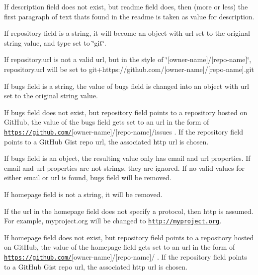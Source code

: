 \begin{DoxyItemize}
\item If {\ttfamily description} field does not exist, but {\ttfamily readme} field does, then (more or less) the first paragraph of text that\textquotesingle{}s found in the readme is taken as value for {\ttfamily description}.
\item If {\ttfamily repository} field is a string, it will become an object with {\ttfamily url} set to the original string value, and {\ttfamily type} set to {\ttfamily \char`\"{}git\char`\"{}}.
\item If {\ttfamily repository.\+url} is not a valid url, but in the style of \char`\"{}\mbox{[}owner-\/name\mbox{]}/\mbox{[}repo-\/name\mbox{]}\char`\"{}, {\ttfamily repository.\+url} will be set to git+https\+://github.com/\mbox{[}owner-\/name\mbox{]}/\mbox{[}repo-\/name\mbox{]}.git
\item If {\ttfamily bugs} field is a string, the value of {\ttfamily bugs} field is changed into an object with {\ttfamily url} set to the original string value.
\item If {\ttfamily bugs} field does not exist, but {\ttfamily repository} field points to a repository hosted on Git\+Hub, the value of the {\ttfamily bugs} field gets set to an url in the form of \href{https://github.com/}{\tt https\+://github.\+com/}\mbox{[}owner-\/name\mbox{]}/\mbox{[}repo-\/name\mbox{]}/issues . If the repository field points to a Git\+Hub Gist repo url, the associated http url is chosen.
\item If {\ttfamily bugs} field is an object, the resulting value only has email and url properties. If email and url properties are not strings, they are ignored. If no valid values for either email or url is found, bugs field will be removed.
\item If {\ttfamily homepage} field is not a string, it will be removed.
\item If the url in the {\ttfamily homepage} field does not specify a protocol, then http is assumed. For example, {\ttfamily myproject.\+org} will be changed to {\ttfamily \href{http://myproject.org}{\tt http\+://myproject.\+org}}.
\item If {\ttfamily homepage} field does not exist, but {\ttfamily repository} field points to a repository hosted on Git\+Hub, the value of the {\ttfamily homepage} field gets set to an url in the form of \href{https://github.com/}{\tt https\+://github.\+com/}\mbox{[}owner-\/name\mbox{]}/\mbox{[}repo-\/name\mbox{]}/ . If the repository field points to a Git\+Hub Gist repo url, the associated http url is chosen.
\end{DoxyItemize}


